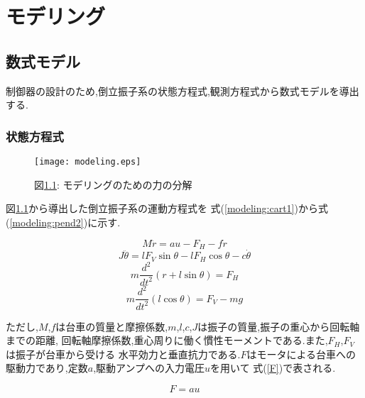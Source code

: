 \chapter{モデリング}
\label{chapter_modeling}
\section{数式モデル}
制御器の設計のため,倒立振子系の状態方程式,観測方程式から数式モデルを導出する.

\subsection{状態方程式}

\begin{figure}[htbp]
    \begin{center}
        \texttt{[image: modeling.eps]}
        \caption{図\ref{modeling}: モデリングのための力の分解}
        \label{modeling}
    \end{center}
\end{figure}

図\ref{modeling}から導出した倒立振子系の運動方程式を
式(\ref{modeling:cart1})から式(\ref{modeling:pend2})に示す.

\begin{equation}
    M \ddot{r} = au - F_{H} - f \dot{r}
    \label{modeling:cart1}
\end{equation}
\begin{equation}
    J \ddot{\theta} = lF_{V}\sin{\theta} - lF_{H}\cos{\theta} - c \dot{\theta}
    \label{modeling:pend1}
\end{equation}
\begin{equation}
    m\frac{d^2}{dt^2}(r + l\sin{\theta}) = F_{H}
    \label{modeling:cart2}
\end{equation}
\begin{equation}
    m\frac{d^2}{dt^2}(l\cos{\theta}) = F_{V} - mg
    \label{modeling:pend2}
\end{equation}

ただし,$M$,$f$は台車の質量と摩擦係数,$m$,$l$,$c$,$J$は振子の質量,振子の重心から回転軸までの距離,
回転軸摩擦係数,重心周りに働く慣性モーメントである.また,$F_{H}$,$F_{V}$は振子が台車から受ける
水平効力と垂直抗力である.$F$はモータによる台車への駆動力であり,定数$a$,駆動アンプへの入力電圧$u$を用いて
式(\ref{F})で表される.

\begin{equation}
    F = au
    \label{F}
\end{equation}

